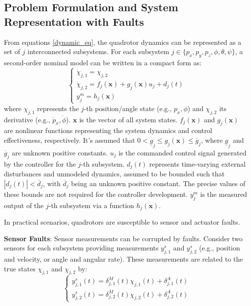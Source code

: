 \subsection{Problem Formulation and System Representation with Faults}
From equations \eqref{dynamic_eq}, the quadrotor dynamics can be represented as a set of $j$ interconnected subsystems. For each subsystem $j \in \{p_x, p_y, p_z, \phi, \theta, \psi\}$, a second-order nominal model can be written in a compact form as:
\begin{equation}
\label{eq:compact_subsystem_quad_nominal}
\begin{cases}
\dot{\chi}_{j,1} = \chi_{j,2} \\
\dot{\chi}_{j,2} = f_j(\mathbf{x}) + g_j(\mathbf{x}) u_j + d_j(t) \\
y_j^m = h_j(\mathbf{x})
\end{cases}
\end{equation}
where $\chi_{j,1}$ represents the $j$-th position/angle state (e.g., $p_x, \phi$) and $\chi_{j,2}$ its derivative (e.g., $\dot{p}_x, \dot{\phi}$). $\mathbf{x}$ is the vector of all system states. $f_j(\mathbf{x})$ and $g_j(\mathbf{x})$ are nonlinear functions representing the system dynamics and control effectiveness, respectively. It's assumed that $0 < \underline{g}_j \le g_j(\mathbf{x}) \le \overline{g}_j$, where $\underline{g}_j$ and $\overline{g}_j$ are unknown positive constants. $u_j$ is the commanded control signal generated by the controller for the $j$-th subsystem. $d_j(t)$ represents time-varying external disturbances and unmodeled dynamics, assumed to be bounded such that $|d_j(t)| < \overline{d}_j$, with $\overline{d}_j$ being an unknown positive constant. The precise values of these bounds are not required for the controller development. $y_j^m$ is the measured output of the $j$-th subsystem via a function $h_j(\mathbf{x})$.

In practical scenarios, quadrotors are susceptible to sensor and actuator faults.

\textbf{Sensor Faults}:
Sensor measurements can be corrupted by faults. Consider two sensors for each subsystem providing measurements $y_{j,1}^s$ and $y_{j,2}^s$ (e.g., position and velocity, or angle and angular rate). These measurements are related to the true states $\chi_{j,1}$ and $\chi_{j,2}$ by:
\begin{equation}
\label{eq:sensor_fault_model_quad}
\begin{cases}
y_{j,1}^s(t) = \delta_{j,1}^M(t) \chi_{j,1}(t) + \delta_{j,1}^A(t) \\
y_{j,2}^s(t) = \delta_{j,2}^M(t) \chi_{j,2}(t) + \delta_{j,2}^A(t)
\end{cases}
\end{equation}

